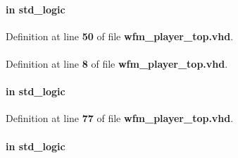 \paragraph[{fr\+\_\+start}]{ {\bfseries \textcolor{keywordflow}{in}\textcolor{vhdlchar}{ }} {\bfseries \textcolor{comment}{std\+\_\+logic}\textcolor{vhdlchar}{ }} \hspace{0.3cm}{\ttfamily [Port]}}\label{classwfm__player__top_a2e71bd12426c63495ee40ba7316f5c24}


Definition at line {\bf 50} of file {\bf wfm\+\_\+player\+\_\+top.\+vhd}.

\paragraph[{ieee}]{\hspace{0.3cm}{\ttfamily [Library]}}\label{classwfm__player__top_a0a6af6eef40212dbaf130d57ce711256}


Definition at line {\bf 8} of file {\bf wfm\+\_\+player\+\_\+top.\+vhd}.

\paragraph[{insert\+\_\+error}]{ {\bfseries \textcolor{keywordflow}{in}\textcolor{vhdlchar}{ }} {\bfseries \textcolor{comment}{std\+\_\+logic}\textcolor{vhdlchar}{ }} \hspace{0.3cm}{\ttfamily [Port]}}\label{classwfm__player__top_a13000f9b73c00894d1a0e32c8285399a}


Definition at line {\bf 77} of file {\bf wfm\+\_\+player\+\_\+top.\+vhd}.

\paragraph[{iq\+\_\+clk}]{ {\bfseries \textcolor{keywordflow}{in}\textcolor{vhdlchar}{ }} {\bfseries \textcolor{comment}{std\+\_\+logic}\textcolor{vhdlchar}{ }} \hspace{0.3cm}{\ttfamily [Port]}}\label{classwfm__player__top_a8f20c0ffd289db7f2c8102fffdb928d9}


